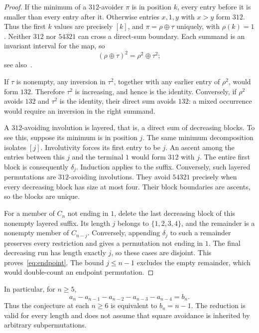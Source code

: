 \documentclass[11pt,a4paper]{article}
\begin{document}
\begin{proof}
If the minimum of a $312$-avoider $\pi$ is in position $k$, every entry
before it is smaller than every entry after it. Otherwise entries $x,1,y$
with $x>y$ form $312$. Thus the first $k$ values are precisely $[k]$, and
$\pi=\rho\oplus\tau$ uniquely, with $\rho(k)=1$.
Neither $312$ nor $54321$ can cross a direct-sum boundary.
Each summand is an invariant interval for the map, so
\[
 (\rho\oplus\tau)^2=\rho^2\oplus\tau^2;
\]
see also~\cite[Lemma~2.1]{ArcherGeary2024}.

If $\tau$ is nonempty, any inversion in $\tau^2$, together with any earlier
entry of $\rho^2$, would form $132$. Therefore $\tau^2$ is increasing,
and hence is the identity. Conversely, if $\rho^2$ avoids $132$ and
$\tau^2$ is the identity, their direct sum avoids $132$: a mixed occurrence
would require an inversion in the right summand.

A $312$-avoiding involution is layered, that is, a direct sum of decreasing
blocks. To see this, suppose its minimum is in position $j$. The same
minimum decomposition isolates $[j]$. Involutivity forces its first entry
to be $j$. An ascent among the entries between this $j$ and the terminal
$1$ would form $312$ with $j$. The entire first block is consequently
$\delta_j$. Induction applies to the suffix. Conversely, such layered
permutations are $312$-avoiding involutions. They avoid $54321$ precisely
when every decreasing block has size at most four. Their block boundaries
are ascents, so the blocks are unique.

For a member of $C_n$ not ending in $1$, delete the last decreasing block
of this nonempty layered suffix. Its length $j$ belongs to $\{1,2,3,4\}$,
and the remainder is a nonempty member of $C_{n-j}$. Conversely, appending
$\delta_j$ to such a remainder preserves every restriction and gives a
permutation not ending in $1$. The final decreasing run has length exactly
$j$, so these cases are disjoint. This proves~\eqref{eq:endpoint}. The bound
$j\leq n-1$ excludes the empty remainder, which would double-count an
endpoint permutation.
\end{proof}

In particular, for $n\geq5$,
\begin{equation}\label{eq:residual}
 a_n-a_{n-1}-a_{n-2}-a_{n-3}-a_{n-4}=b_n.
\end{equation}
Thus the conjecture at each $n\geq6$ is equivalent to $b_n=n-1$.
The reduction is valid for every length and does not assume that square
avoidance is inherited by arbitrary subpermutations.
\end{document}

